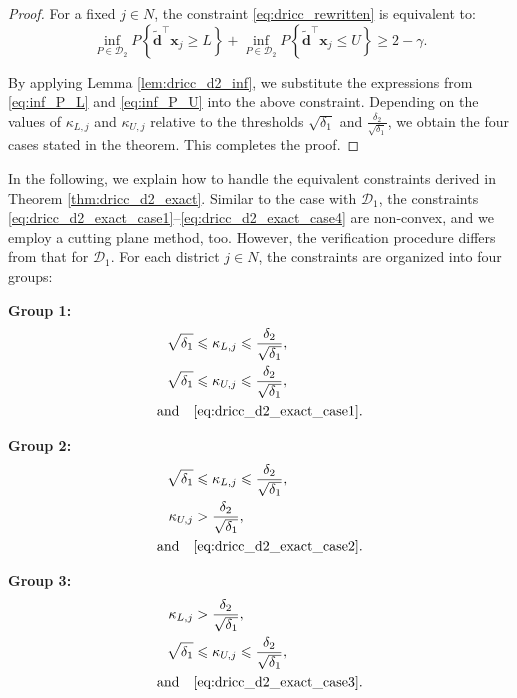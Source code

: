 \documentclass[preprint,12pt,authoryear]{elsarticle}
\begin{document}
\begin{proof}
For a fixed $j \in N$, the constraint \eqref{eq:dricc_rewritten} is equivalent to:
\begin{equation}
\inf_{P \in \mathcal{D}_{2}} P\left\{ \widetilde{\mathbf{d}}^{\top} \mathbf{x}_{j} \geqslant L \right\} + \inf_{P \in \mathcal{D}_{2}} P\left\{ \widetilde{\mathbf{d}}^{\top} \mathbf{x}_{j} \leqslant U \right\} \geqslant 2 - \gamma.
\end{equation}

By applying Lemma \ref{lem:dricc_d2_inf}, we substitute the expressions from \eqref{eq:inf_P_L} and \eqref{eq:inf_P_U} into the above constraint. Depending on the values of $\kappa_{L,j}$ and $\kappa_{U,j}$ relative to the thresholds $\sqrt{\delta_1}$ and $\frac{\delta_2}{\sqrt{\delta_1}}$, we obtain the four cases stated in the theorem. This completes the proof.
\end{proof}

In the following, we explain how to handle the equivalent constraints derived in Theorem \ref{thm:dricc_d2_exact}. Similar to the case with $\mathcal{D}_1$, the constraints \eqref{eq:dricc_d2_exact_case1}--\eqref{eq:dricc_d2_exact_case4} are non-convex, and we employ a cutting plane method, too. However, the verification procedure differs from that for $\mathcal{D}_1$. For each district $j \in N$, the constraints are organized into four groups:

\textbf{Group 1:}
\begin{align}
\sqrt{\delta_1} &\leqslant \kappa_{L,j} \leqslant \frac{\delta_2}{\sqrt{\delta_1}}, \label{eq:group1_range1} \\
\sqrt{\delta_1} &\leqslant \kappa_{U,j} \leqslant \frac{\delta_2}{\sqrt{\delta_1}}, \label{eq:group1_range2} \\
\text{and} \quad &\eqref{eq:dricc_d2_exact_case1}.
\end{align}

\textbf{Group 2:}
\begin{align}
\sqrt{\delta_1} &\leqslant \kappa_{L,j} \leqslant \frac{\delta_2}{\sqrt{\delta_1}}, \label{eq:group2_range1} \\
\kappa_{U,j} &> \frac{\delta_2}{\sqrt{\delta_1}}, \label{eq:group2_range2} \\
\text{and} \quad &\eqref{eq:dricc_d2_exact_case2}.
\end{align}

\textbf{Group 3:}
\begin{align}
\kappa_{L,j} &> \frac{\delta_2}{\sqrt{\delta_1}}, \label{eq:group3_range1} \\
\sqrt{\delta_1} &\leqslant \kappa_{U,j} \leqslant \frac{\delta_2}{\sqrt{\delta_1}}, \label{eq:group3_range2} \\
\text{and} \quad &\eqref{eq:dricc_d2_exact_case3}.
\end{align}
\end{document}
